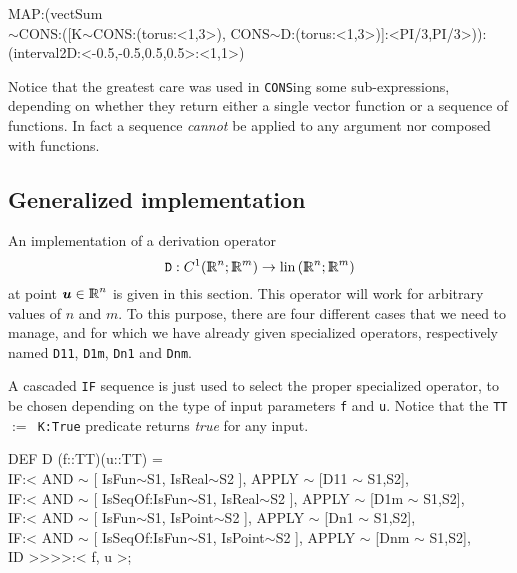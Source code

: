\documentclass{31x47jw}
\begin{document}
\begin{example}
\begin{smallplasm} 
    MAP:(vectSum\\
    $\sim$CONS:([K$\sim$CONS:(torus:<1,3>), 
    CONS$\sim$D:(torus:<1,3>)]:<PI/3,PI/3>)):\+\\
    (interval2D:<-0.5,-0.5,0.5,0.5>:<1,1>)
\end{smallplasm} 
Notice that the greatest care was used in \texttt{CONS}ing some
sub-expressions, depending on whether they return either a single
vector function or a sequence of functions.  In fact a sequence
\emph{cannot} be applied to any argument nor composed with functions.

\end{example}


\subsection{Generalized implementation}

An implementation of a derivation operator 
\[
\texttt{D} : C^{1}(\R^{n};\R^{m}) \rightarrow \lin (\R^{n};\R^{m})
\]
at point ${\mbox{\boldmath $u$}}\in \mathbb{I\!\!R}^{n}$ is given in this section.  This operator
will work for arbitrary values of $n$ and $m$.  To this purpose, there
are four different cases that we need to manage, and for which we have
already given specialized operators, respectively named \texttt{D11},
\texttt{D1m}, \texttt{Dn1} and \texttt{Dnm}.

A cascaded \texttt{IF} sequence is just used to select the proper specialized 
operator, to be chosen depending on the type of input parameters \texttt{f} 
and \texttt{u}. Notice that the \texttt{TT $:=$ K:True} predicate returns 
\emph{true} for any input.

\begin{script}
\begin{smallplasm} 
DEF D  (f::TT)(u::TT) = \+\\
  IF:< AND $\sim$ [ IsFun$\sim$S1, IsReal$\sim$S2 ], APPLY $\sim$ [D11 $\sim$ S1,S2], \\
  IF:< AND $\sim$ [ IsSeqOf:IsFun$\sim$S1, IsReal$\sim$S2 ], APPLY $\sim$ [D1m $\sim$ S1,S2], \\
  IF:< AND $\sim$ [ IsFun$\sim$S1, IsPoint$\sim$S2 ], APPLY $\sim$ [Dn1 $\sim$ S1,S2], \\
  IF:< AND $\sim$ [ IsSeqOf:IsFun$\sim$S1, IsPoint$\sim$S2 ], APPLY $\sim$ [Dnm $\sim$ S1,S2], 
  \-\\
ID >>>>:< f, u >;
\end{smallplasm} 
\label{script:5:D}
\end{script}
\end{document}
